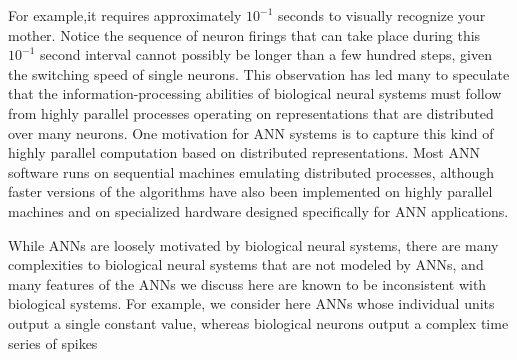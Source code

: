 \documentclass[../main.tex]{subfiles}
\begin{document}
For example,it requires approximately $10^{-1}$ seconds to visually recognize your mother. Notice the sequence of neuron firings that can take place during this $10^{-1}$ second interval cannot possibly be longer than a few hundred steps, given the switching speed of single neurons. This observation has led many to speculate that the information-processing abilities of biological neural systems must follow from highly parallel processes operating on representations that are distributed over many neurons. One motivation for ANN systems is to capture this kind of highly parallel computation based on distributed representations. Most ANN software runs on sequential machines emulating distributed processes, although faster versions of the algorithms have also been implemented on highly parallel machines and on specialized hardware designed specifically for ANN applications.

While ANNs are loosely motivated by biological neural systems, there are many complexities to biological neural systems that are not modeled by ANNs, and many features of the ANNs we discuss here are known to be inconsistent with biological systems. For example, we consider here ANNs whose individual units output a single constant value, whereas biological neurons output a complex time series of spikes
\end{document}
